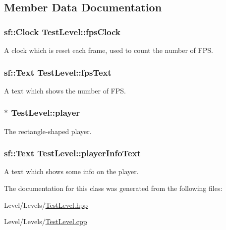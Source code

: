\subsection{Member Data Documentation}
\hypertarget{class_test_level_a856b65cd7d74f6f283dc467e9ed954df}{}
\subsubsection[{fps\+Clock}]{\setlength{\rightskip}{0pt plus 5cm}sf\+::\+Clock Test\+Level\+::fps\+Clock\hspace{0.3cm}{\ttfamily [protected]}}\label{class_test_level_a856b65cd7d74f6f283dc467e9ed954df}
A clock which is reset each frame, used to count the number of F\+P\+S. \hypertarget{class_test_level_a230d13d6ab7b2b95c971a49e732710ca}{}
\subsubsection[{fps\+Text}]{\setlength{\rightskip}{0pt plus 5cm}sf\+::\+Text Test\+Level\+::fps\+Text\hspace{0.3cm}{\ttfamily [protected]}}\label{class_test_level_a230d13d6ab7b2b95c971a49e732710ca}
A text which shows the number of F\+P\+S. \hypertarget{class_test_level_a122398737974e85c0c652cc8b07b74b8}{}
\subsubsection[{player}]{$\ast$ Test\+Level\+::player\hspace{0.3cm}{\ttfamily [protected]}}\label{class_test_level_a122398737974e85c0c652cc8b07b74b8}
The rectangle-\/shaped player. \hypertarget{class_test_level_a55f3d8b00469758c027c4788357fe535}{}
\subsubsection[{player\+Info\+Text}]{\setlength{\rightskip}{0pt plus 5cm}sf\+::\+Text Test\+Level\+::player\+Info\+Text\hspace{0.3cm}{\ttfamily [protected]}}\label{class_test_level_a55f3d8b00469758c027c4788357fe535}
A text which shows some info on the player. 

The documentation for this class was generated from the following files\+:\begin{DoxyCompactItemize}
\item 
Level/\+Levels/\hyperlink{_test_level_8hpp}{Test\+Level.\+hpp}\item 
Level/\+Levels/\hyperlink{_test_level_8cpp}{Test\+Level.\+cpp}\end{DoxyCompactItemize}
